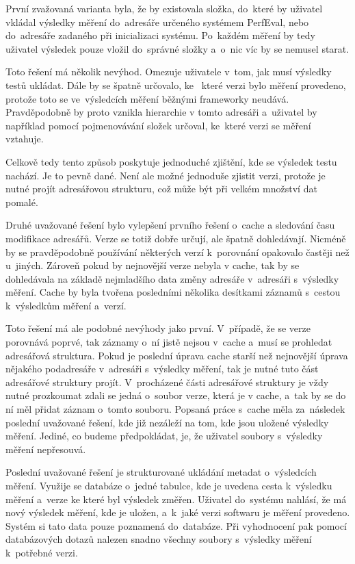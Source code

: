 První zvažovaná varianta byla, že by existovala složka, do~které by uživatel vkládal výsledky měření do~adresáře určeného
systémem PerfEval, nebo do~adresáře zadaného při inicializaci systému. Po~každém měření by tedy uživatel výsledek pouze
vložil do~správné složky a~o~nic víc by se nemusel starat.

Toto řešení má několik nevýhod. Omezuje uživatele v~tom, jak musí výsledky testů ukládat. Dále by se špatně určovalo, ke~
které verzi bylo měření provedeno, protože toto se ve~výsledcích měření běžnými frameworky neudává. Pravděpodobně by proto
vznikla hierarchie v tomto adresáři a~uživatel by například pomocí pojmenovávání složek určoval, ke~které verzi se měření vztahuje.

Celkově tedy tento způsob poskytuje jednoduché zjištění, kde se výsledek testu nachází. Je to pevně dané. Není ale možné jednoduše
zjistit verzi, protože je nutné projít adresářovou strukturu, což může být při velkém množství dat pomalé.

Druhé uvažované řešení bylo vylepšení prvního řešení o~cache a sledování času modifikace adresářů. Verze se totiž dobře určují,
ale špatně dohledávají. Nicméně by se pravděpodobně používání některých verzí k~porovnání opakovalo častěji než u~jiných.
Zároveň pokud by nejnovější verze nebyla v cache, tak by se dohledávala na základě nejmladšího data změny adresáře
v~adresáři s~výsledky měření. Cache by byla tvořena posledními několika desítkami záznamů s~cestou k~výsledkům měření a~verzí.

Toto řešení má ale podobné nevýhody jako první. V~případě, že se verze porovnává poprvé, tak záznamy o~ní jistě nejsou v~cache
a~musí se prohledat adresářová struktura. Pokud je poslední úprava cache starší než nejnovější úprava nějakého podadresáře v~adresáři
s~výsledky měření, tak je nutné tuto část adresářové struktury projít. V~procházené části adresářové struktury je vždy nutné prozkoumat
zdali se jedná o~soubor verze, která je v cache, a~tak by se do ní měl přidat záznam o~tomto souboru. Popsaná práce s~cache měla
za~následek poslední uvažované řešení, kde již nezáleží na tom, kde jsou uložené výsledky měření. Jediné, co budeme předpokládat, je,
že uživatel soubory s~výsledky měření nepřesouvá.

Poslední uvažované řešení je strukturované ukládání metadat o~výsledcích měření. Využije se databáze o~jedné tabulce, kde
je uvedena cesta k~výsledku měření a~verze ke které byl výsledek změřen. Uživatel do~systému nahlásí, že má nový výsledek
měření, kde je uložen, a~k~jaké verzi softwaru je měření provedeno. Systém si tato data pouze poznamená do~databáze. Při
vyhodnocení pak pomocí databázových dotazů nalezen snadno všechny soubory s~výsledky měření k~potřebné verzi.

